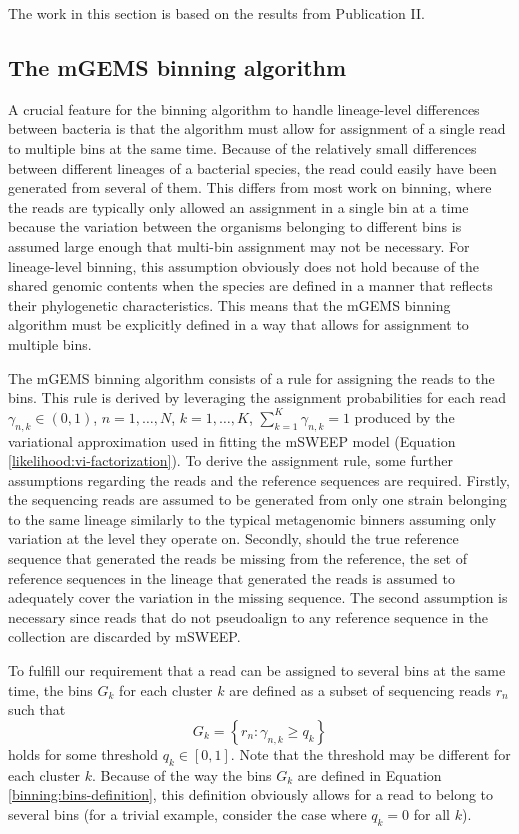 \documentclass[officiallayout]{tktla}
\begin{document}
The work in this section is based on the results from Publication
II.

\subsection{The mGEMS binning algorithm}

A crucial feature for the binning algorithm to handle lineage-level
differences between bacteria is that the algorithm must allow for
assignment of a single read to multiple bins at the same time. Because
of the relatively small differences between different lineages of a
bacterial species, the read could easily have been generated from
several of them. This differs from most work on binning, where the
reads are typically only allowed an assignment in a single bin at a
time because the variation between the organisms belonging to
different bins is assumed large enough that multi-bin assignment may
not be necessary. For lineage-level binning, this
assumption obviously does not hold because of the shared genomic
contents when the species are defined in a manner that reflects their
phylogenetic characteristics. This means that the mGEMS binning
algorithm must be explicitly defined in a way that allows for
assignment to multiple bins.

The mGEMS binning algorithm consists of a rule for assigning the reads
to the bins. This rule is derived by leveraging the assignment
probabilities for each read $\gamma_{n, k} \in \left(0, 1\right)$, $n
= 1, \dots, N$, $k = 1, \dots, K$, $\sum_{k = 1}^{K}\gamma_{n, k} = 1$
produced by the variational approximation used in fitting the mSWEEP
model (Equation \eqref{likelihood:vi-factorization}). To derive the
assignment rule, some further assumptions regarding the reads and the
reference sequences are required. Firstly, the sequencing reads are
assumed to be generated from only one strain belonging to the same
lineage \textemdash{ } similarly to the typical metagenomic binners
assuming only variation at the level they operate on. Secondly, should
the true reference sequence that generated the reads be missing from
the reference, the set of reference sequences in the lineage that
generated the reads is assumed to adequately cover the variation in
the missing sequence. The second assumption is necessary since reads
that do not pseudoalign to any reference sequence in the collection
are discarded by mSWEEP.

To fulfill our requirement that a read can be assigned to several bins
at the same time, the bins $G_{k}$ for each cluster $k$ are defined as
a subset of sequencing reads $r_{n}$ such that
\begin{equation}
  \label{binning:bins-definition}
  G_{k} = \left\{r_{n} : \gamma_{n, k} \geq q_{k}\right\}
\end{equation}
holds for some threshold $q_{k} \in \left[0, 1\right]$. Note that the
threshold may be different for each cluster $k$. Because of the way
the bins $G_{k}$ are defined in Equation
\eqref{binning:bins-definition}, this definition obviously allows for
a read to belong to several bins (for a trivial example, consider
the case where $q_{k} = 0$ for all $k$).
\end{document}
